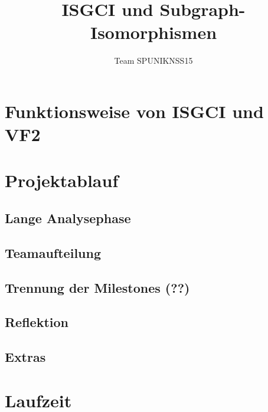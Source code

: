 \documentclass[t]{beamer}
\title{ISGCI und Subgraph-Isomorphismen}
\author{Team SPUNIKNSS15}
\date{}
\begin{document}
  
  \frame{
    \tableofcontents
  }
  \section{Funktionsweise von ISGCI und VF2}
  
  
  \section{Projektablauf}
    
    \subsection{Lange Analysephase}
    
    \subsection{Teamaufteilung}
    
    \subsection{Trennung der Milestones (??)}
    
    \subsection{Reflektion}
    
    \subsection{Extras}
    
  \section{Laufzeit}
  
\end{document}
